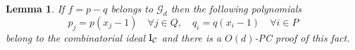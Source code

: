 \documentclass[11pt]{article}
\newcommand{\Cc}{\mathcal{C}}
\newcommand{\I}{\emph{$\rm{I}$}}
\newcommand{\1}{\textbf{1}}
\newtheorem{lemma}[theorem]{Lemma}
\begin{document}
\begin{lemma}\label{th:MiNVA_sos}
If $f=p-q$ belongs to $\mathcal{G}_d$ then the following polynomials 
%
\begin{equation}\label{MINVA1}
    {p_j = p(x_j-1) \quad \forall j \in Q, \quad q_i = q(x_i-1) \quad \forall i \in P}
\end{equation}
%
belong to the combinatorial ideal $\I_\Cc$ and there is a $O(d)$-PC proof of this fact.
\end{lemma}
\end{document}

